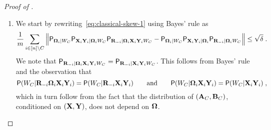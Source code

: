 \begin{proof}[Proof of ]
\begin{enumerate}
\item We start by rewriting~\eqref{eq:classical-skew-1} using Bayes' rule as
\begin{equation}
\label{eq:classical-skew-2}
\frac{1}{m} \sum_{i \in [n] \setminus C} \Big \| \mathsf{P}_{{\boldsymbol{\Omega}}_i |W_C} \mathsf{P}_{\mathbf{X}_i \mathbf{Y}_i | {\boldsymbol{\Omega}}_i W_C} \mathsf{P}_{\mathbf{R}_{-i} | {\boldsymbol{\Omega}}_i \mathbf{X}_i \mathbf{Y}_i W_C} - \mathsf{P}_{{\boldsymbol{\Omega}}_i | W_C} \mathsf{P}_{\mathbf{X}_i \mathbf{Y}_i | {\boldsymbol{\Omega}}_i} \mathsf{P}_{\mathbf{R}_{-i} |{\boldsymbol{\Omega}}_i  W_C}  \Big \| \leq \sqrt{\delta}\;.
\end{equation}
We note that $\mathsf{P}_{\mathbf{R}_{-i} | {\boldsymbol{\Omega}}_i \mathbf{X}_i \mathbf{Y}_i W_C} = \mathsf{P}_{\mathbf{R}_{-i} |\mathbf{X}_i \mathbf{Y}_i W_C}$. This follows from Bayes' rule and the observation that 
\[\mathsf{P}(W_C | \mathbf{R}_{-i} {\boldsymbol{\Omega}}_i \mathbf{X}_i \mathbf{Y}_i) = \mathsf{P}(W_C | \mathbf{R}_{-i} \mathbf{X}_i \mathbf{Y}_i)\qquad\text{and}\qquad \mathsf{P}(W_C | {\boldsymbol{\Omega}}_i \mathbf{X}_i \mathbf{Y}_i) = \mathsf{P}(W_C | \mathbf{X}_i \mathbf{Y}_i)\;,\] which in turn follow from the fact that the distribution of $(\mathbf{A}_C,\mathbf{B}_C)$, conditioned on $(\mathbf{X},\mathbf{Y})$, does not depend on ${\boldsymbol{\Omega}}$. 


\end{enumerate}
\end{proof}
